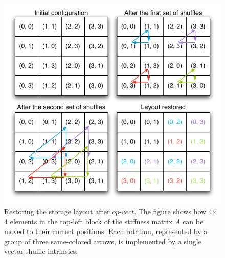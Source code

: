 \documentclass[conference]{IEEEtran}
\begin{document}
\begin{figure}[t]
\centerline{\includegraphics[scale=0.7]{Pictures/vect-restore.pdf}}
\caption{Restoring the storage layout after $op$-$vect$. The figure shows how 4$\times$4 elements in the top-left block of the stiffness matrix $A$ can be moved to their correct positions. Each rotation, represented by a group of three same-colored arrows, is implemented by a single vector shuffle intrinsics.}
\label{fig:restore-layout}
\end{figure}

\end{document}
